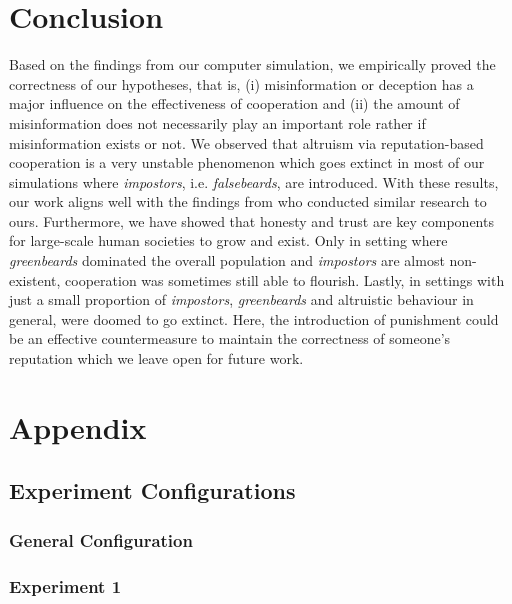 \documentclass[sigconf]{acmart}
\newcommand{\impostors}{\textit{impostors}\xspace}
\newcommand{\greenbeards}{\textit{greenbeards}\xspace}
\begin{document}
    \section{Conclusion}\label{sec:conclusion}
    Based on the findings from our computer simulation, we empirically proved the correctness of our hypotheses, that is, (i) misinformation or deception has a major influence on the effectiveness of cooperation and (ii) the amount of misinformation does not necessarily play an important role rather if misinformation exists or not.
    We observed that altruism via reputation-based cooperation is a very unstable phenomenon which goes extinct in most of our simulations where \impostors, i.e. \textit{falsebeards}, are introduced.
    With these results, our work aligns well with the findings from \citeauthor{szamado_deception_2016} who conducted similar research to ours.
    Furthermore, we have showed that honesty and trust are key components for large-scale human societies to grow and exist.
    Only in setting where \greenbeards dominated the overall population and \impostors are almost non-existent, cooperation was sometimes still able to flourish.
    Lastly, in settings with just a small proportion of \impostors, \greenbeards and altruistic behaviour in general, were doomed to go extinct.
    Here, the introduction of punishment could be an effective countermeasure to maintain the correctness of someone's reputation which we leave open for future work.

    
    

    \clearpage

    \onecolumn
    \section*{Appendix}

    \subsection{Experiment Configurations}\label{sec:configs}
    \subsubsection*{General Configuration}
    

    \subsubsection*{Experiment 1}
    
\end{document}
